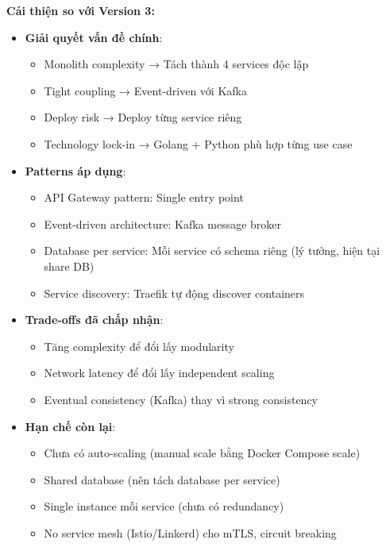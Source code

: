 \noindent\textbf{Cải thiện so với Version 3:}

\begin{itemize}
    \item \textbf{Giải quyết vấn đề chính}:
    \begin{itemize}
        \item Monolith complexity → Tách thành 4 services độc lập
        \item Tight coupling → Event-driven với Kafka
        \item Deploy risk → Deploy từng service riêng
        \item Technology lock-in → Golang + Python phù hợp từng use case
    \end{itemize}
    
    \item \textbf{Patterns áp dụng}:
    \begin{itemize}
        \item API Gateway pattern: Single entry point
        \item Event-driven architecture: Kafka message broker
        \item Database per service: Mỗi service có schema riêng (lý tưởng, hiện tại share DB)
        \item Service discovery: Traefik tự động discover containers
    \end{itemize}
    
    \item \textbf{Trade-offs đã chấp nhận}:
    \begin{itemize}
        \item Tăng complexity để đổi lấy modularity
        \item Network latency để đổi lấy independent scaling
        \item Eventual consistency (Kafka) thay vì strong consistency
    \end{itemize}
    
    \item \textbf{Hạn chế còn lại}:
    \begin{itemize}
        \item Chưa có auto-scaling (manual scale bằng Docker Compose scale)
        \item Shared database (nên tách database per service)
        \item Single instance mỗi service (chưa có redundancy)
        \item No service mesh (Istio/Linkerd) cho mTLS, circuit breaking
    \end{itemize}
\end{itemize}

